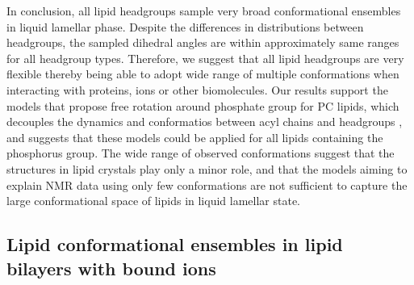 \documentclass[aps,prl,superscriptaddress,twocolumn]{revtex4}
\begin{document}
In conclusion, all lipid headgroups sample very broad conformational ensembles in liquid lamellar phase.
Despite the differences in distributions
between headgroups, the sampled dihedral angles are within approximately same ranges for all headgroup types.
Therefore, we suggest that all lipid headgroups are very flexible thereby being
able to adopt wide range of multiple conformations when interacting with proteins, ions or other biomolecules.
Our results support the models that propose free rotation around phosphate group for PC lipids,
which decouples the dynamics and conformatios between acyl chains and headgroups \cite{klauda08c,antila21b},
and suggests that these models could be applied for all lipids containing the phosphorus group.
The wide range of observed conformations suggest that the structures in lipid crystals \cite{buldt81,pascher92}
play only a minor role, and that the models aiming to explain NMR data using only few conformations \cite{seelig77c,davis83,Semchyschyn04,akutsu20}
are not sufficient to capture the large conformational space of lipids in liquid lamellar state.


\subsection{Lipid conformational ensembles in lipid bilayers with bound ions}
\end{document}
